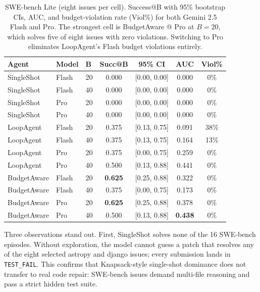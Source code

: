 \documentclass[11pt]{article}
\begin{document}
\begin{table}[t]
  \centering
  \caption{SWE-bench Lite (eight issues per cell). Success@B with 95\%
  bootstrap CIs, AUC, and budget-violation rate (Viol\%) for both
  Gemini 2.5 Flash and Pro. The strongest cell is BudgetAware @ Pro at
  $B{=}20$, which solves five of eight issues with zero violations.
  Switching to Pro eliminates LoopAgent's Flash budget violations
  entirely.}
  \label{tab:swe}
  \footnotesize
  \begin{tabular}{lllcccc}
    \toprule
    Agent & Model & B & Succ@B & 95\% CI & AUC & Viol\% \\
    \midrule
    SingleShot  & Flash & 20 & 0.000 & [0.00, 0.00] & 0.000 & 0\% \\
    SingleShot  & Flash & 40 & 0.000 & [0.00, 0.00] & 0.000 & 0\% \\
    SingleShot  & Pro   & 20 & 0.000 & [0.00, 0.00] & 0.000 & 0\% \\
    SingleShot  & Pro   & 40 & 0.000 & [0.00, 0.00] & 0.000 & 0\% \\
    LoopAgent   & Flash & 20 & 0.375 & [0.13, 0.75] & 0.091 & 38\% \\
    LoopAgent   & Flash & 40 & 0.375 & [0.13, 0.75] & 0.164 & 13\% \\
    LoopAgent   & Pro   & 20 & 0.375 & [0.00, 0.75] & 0.259 & 0\% \\
    LoopAgent   & Pro   & 40 & 0.500 & [0.13, 0.88] & 0.441 & 0\% \\
    BudgetAware & Flash & 20 & \textbf{0.625} & [0.25, 0.88] & 0.322 & 0\% \\
    BudgetAware & Flash & 40 & 0.375 & [0.00, 0.75] & 0.173 & 0\% \\
    BudgetAware & Pro   & 20 & \textbf{0.625} & [0.25, 0.88] & 0.378 & 0\% \\
    BudgetAware & Pro   & 40 & 0.500 & [0.13, 0.88] & \textbf{0.438} & 0\% \\
    \bottomrule
  \end{tabular}
\end{table}

Three observations stand out. First, SingleShot solves none of the 16
SWE-bench episodes. Without exploration, the model cannot guess a
patch that resolves any of the eight selected astropy and django
issues; every submission lands in \texttt{TEST\_FAIL}. This confirms
that Knapsack-style single-shot dominance does not transfer to real
code repair: SWE-bench issues demand multi-file reasoning and pass a
strict hidden test suite.
\end{document}
